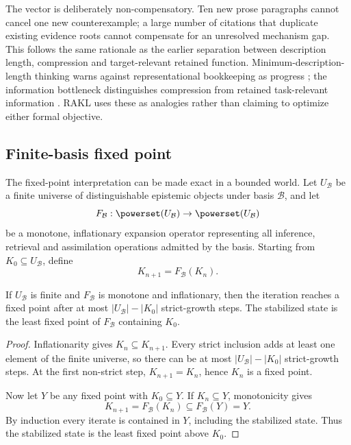 The vector is deliberately non-compensatory. Ten new prose paragraphs cannot cancel one new counterexample; a large number of citations that duplicate existing evidence roots cannot compensate for an unresolved mechanism gap. This follows the same rationale as the earlier separation between description length, compression and target-relevant retained function. Minimum-description-length thinking warns against representational bookkeeping as progress \cite{rissanen1978}; the information bottleneck distinguishes compression from retained task-relevant information \cite{tishby2000}. RAKL uses these as analogies rather than claiming to optimize either formal objective.

\subsection{Finite-basis fixed point}

The fixed-point interpretation can be made exact in a bounded world. Let \(U_{\mathcal B}\) be a finite universe of distinguishable epistemic objects under basis \(\mathcal B\), and let
\[
F_{\mathcal B}:\powerset(U_{\mathcal B})\to\powerset(U_{\mathcal B})
\]
be a monotone, inflationary expansion operator representing all inference, retrieval and assimilation operations admitted by the basis. Starting from \(K_0\subseteq U_{\mathcal B}\), define
\[
K_{n+1}=F_{\mathcal B}(K_n).
\]

\begin{theorem}
If \(U_{\mathcal B}\) is finite and \(F_{\mathcal B}\) is monotone and inflationary, then the iteration reaches a fixed point after at most \(|U_{\mathcal B}|-|K_0|\) strict-growth steps. The stabilized state is the least fixed point of \(F_{\mathcal B}\) containing \(K_0\).
\end{theorem}

\begin{proof}
Inflationarity gives \(K_n\subseteq K_{n+1}\). Every strict inclusion adds at least one element of the finite universe, so there can be at most \(|U_{\mathcal B}|-|K_0|\) strict-growth steps. At the first non-strict step, \(K_{n+1}=K_n\), hence \(K_n\) is a fixed point.

Now let \(Y\) be any fixed point with \(K_0\subseteq Y\). If \(K_n\subseteq Y\), monotonicity gives
\[
K_{n+1}=F_{\mathcal B}(K_n)\subseteq F_{\mathcal B}(Y)=Y.
\]
By induction every iterate is contained in \(Y\), including the stabilized state. Thus the stabilized state is the least fixed point above \(K_0\).
\end{proof}

